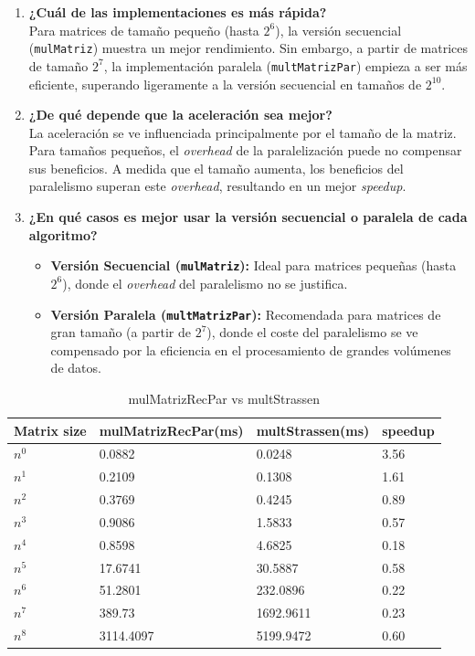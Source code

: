 \documentclass[12pt, a4paper]{article}
\begin{document}
\begin{enumerate}
  \item \textbf{¿Cuál de las implementaciones es más rápida?} \\
  Para matrices de tamaño pequeño (hasta $2^6$), la versión secuencial (\texttt{mulMatriz}) muestra un mejor rendimiento. Sin embargo, a partir de matrices de tamaño $2^7$, la implementación paralela (\texttt{multMatrizPar}) empieza a ser más eficiente, superando ligeramente a la versión secuencial en tamaños de $2^{10}$.

  \item \textbf{¿De qué depende que la aceleración sea mejor?} \\
  La aceleración se ve influenciada principalmente por el tamaño de la matriz. Para tamaños pequeños, el \textit{overhead} de la paralelización puede no compensar sus beneficios. A medida que el tamaño aumenta, los beneficios del paralelismo superan este \textit{overhead}, resultando en un mejor \textit{speedup}.

  \item \textbf{¿En qué casos es mejor usar la versión secuencial o paralela de cada algoritmo?} \\
  \begin{itemize}
    \item \textbf{Versión Secuencial (\texttt{mulMatriz}):} Ideal para matrices pequeñas (hasta $2^6$), donde el \textit{overhead} del paralelismo no se justifica.
    \item \textbf{Versión Paralela (\texttt{multMatrizPar}):} Recomendada para matrices de gran tamaño (a partir de $2^7$), donde el coste del paralelismo se ve compensado por la eficiencia en el procesamiento de grandes volúmenes de datos.
  \end{itemize}
\end{enumerate}

\begin{table}[h]
    \centering
    \begin{tabular}{ | m{2cm} | m{4cm} | m{4cm} | m{3cm} | }
    \hline
    Matrix size & mulMatrizRecPar(ms) & multStrassen(ms) & speedup \\ 
    \hline
    $n^0$ & 0.0882 & 0.0248 & 3.56 \\
    $n^1$ & 0.2109 & 0.1308 & 1.61 \\
    $n^2$ & 0.3769 & 0.4245 & 0.89 \\
    $n^3$ & 0.9086 & 1.5833 & 0.57 \\
    $n^4$ & 0.8598 & 4.6825 & 0.18 \\
    $n^5$ & 17.6741 & 30.5887 & 0.58 \\
    $n^6$ & 51.2801 & 232.0896 & 0.22 \\
    $n^7$ & 389.73 & 1692.9611 & 0.23 \\
    $n^8$ & 3114.4097 & 5199.9472 & 0.60 \\
    \hline
    \end{tabular}
    \caption{mulMatrizRecPar vs multStrassen}
    \label{table:matrix_performance}
\end{table}
\end{document}
